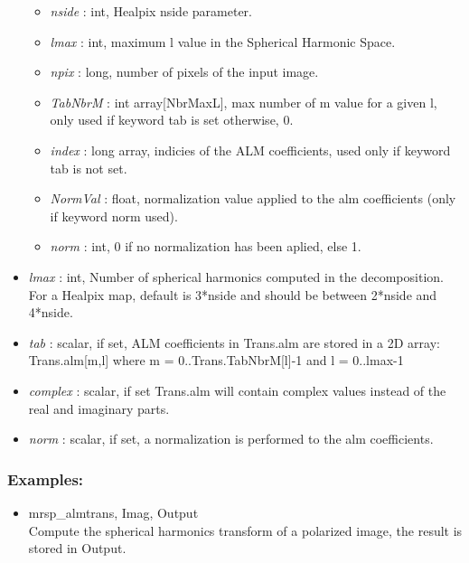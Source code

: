 \begin{itemize}
\begin{itemize}
\item {\em nside} : int, Healpix nside parameter.
\item {\em lmax} : int, maximum l value in the Spherical Harmonic Space.
\item {\em npix} : long, number of pixels of the input image.
\item {\em TabNbrM} : int array[NbrMaxL], max number of m value for a given l, only used if keyword tab is set otherwise, 0.
\item {\em index} : long array, indicies of the ALM coefficients, used only if keyword tab is not set.
\item {\em NormVal} : float, normalization value applied to the alm coefficients (only if keyword norm used).
\item {\em norm} : int, 0 if no normalization has been aplied, else 1.
\end{itemize}
\item {\em lmax} : int, Number of spherical harmonics computed in the decomposition. For a Healpix map, default is 
3*nside and should be between 2*nside and 4*nside.
\item {\em tab} : scalar, if set, ALM coefficients in Trans.alm are stored in a 2D array: Trans.alm[m,l] where m = 0..Trans.TabNbrM[l]-1  and l = 0..lmax-1
\item {\em complex} : scalar, if set Trans.alm will contain complex values instead of the real and imaginary parts.
\item {\em norm} : scalar, if set, a normalization is performed to the alm coefficients.
\end{itemize}

\subsubsection*{Examples:} 
\begin{itemize}
\item mrsp\_almtrans, Imag, Output \\
Compute the spherical harmonics transform of a polarized image, the result is stored in Output.
\end{itemize}



